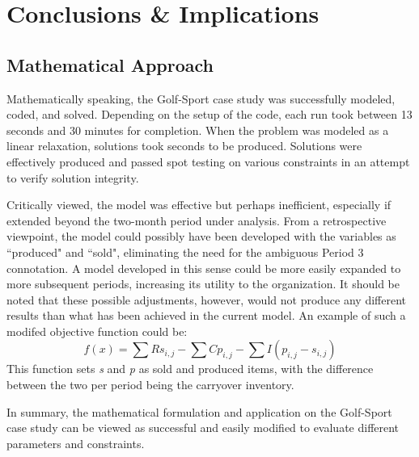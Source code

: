\documentclass{article}
\begin{document}
\section{Conclusions \& Implications}
\subsection{Mathematical Approach}
Mathematically speaking, the Golf-Sport case study was successfully modeled, coded, and solved.  Depending on the setup of the code, each run took between 13 seconds and 30 minutes for completion.  When the problem was modeled as a linear relaxation, solutions took seconds to be produced.  Solutions were effectively produced and passed spot testing on various constraints in an attempt to verify solution integrity.
\par
Critically viewed, the model was effective but perhaps inefficient, especially if extended beyond the two-month period under analysis.  From a retrospective viewpoint, the model could possibly have been developed with the variables as ``produced" and ``sold", eliminating the need for the ambiguous Period 3 connotation.  A model developed in this sense could be more easily expanded to more subsequent periods, increasing its utility to the organization.  It should be noted that these possible adjustments, however, would not produce any different results than what has been achieved in the current model.  An example of such a modifed objective function could be:
$$ f(x) = \sum Rs_{i,j} - \sum Cp_{i,j} - \sum I(p_{i,j}-s_{i,j}) $$
This function sets \textit{s} and \textit{p} as sold and produced items, with the difference between the two per period being the carryover inventory.
\par
In summary, the mathematical formulation and application on the Golf-Sport case study can be viewed as successful and easily modified to evaluate different parameters and constraints.
\end{document}
